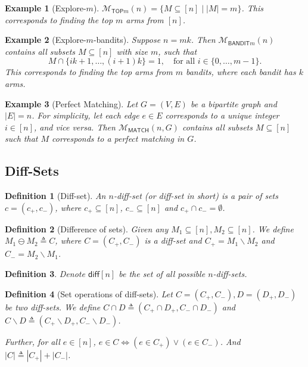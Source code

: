 \documentclass{article}
\newtheorem{define}{Definition}
\newtheorem{example}{Example}
\newcommand{\mmatch}{\mathcal M_{\mathsf{MATCH}}}
\newcommand{\mtop}{\mathcal M_{\mathsf{TOP}m}}
\newcommand{\mbandit}{\mathcal M_{\mathsf{BANDIT}m}}
\newcommand{\diff}{\mathsf{diff}}
\newcommand{\del}{\backslash}
\begin{document}
\begin{spacing}{1.1}
\begin{example}[Explore-$m$]
$\mtop(n)=\{M \subseteq [n] \;|\; |M|=m\}$.
This corresponds to finding the top $m$ arms from $[n]$.
\end{example}

\begin{example}[Explore-$m$-bandits]
Suppose $n=mk$. Then $\mbandit(n)$ contains all subsets $M \subseteq [n]$ with size $m$, such that 
$$ 
M\cap \{ik+1,\ldots, (i+1)k\} = 1, \quad \text{for all } i \in \{0,\ldots, m-1\}.
$$ 
This corresponds to finding the top arms from $m$ bandits, where each bandit has $k$ arms.
\end{example}

\begin{example}[Perfect Matching]
Let $G=(V,E)$ be a bipartite graph and $|E|=n$. 
For simplicity, let each edge $e\in E$ corresponds to a unique integer $i\in [n]$, and vice versa. 
Then $\mmatch(n,G)$ contains all subsets $M \subseteq [n]$ such that $M$ corresponds to a perfect matching in $G$.
\end{example}


\subsection{Diff-Sets}

\begin{define}[Diff-set]
An $n$-diff-set (or diff-set in short) is a pair of sets $c=(c_+,c_-)$, where $c_+\subseteq[n]$, $c_-\subseteq [n]$ and $c_+\cap c_-=\emptyset$.
\end{define}


\begin{define}[Difference of sets]
Given any $M_1\subseteq[n],M_2\subseteq[n]$. We define $M_1\ominus M_2 \triangleq C$, where $C=(C_+,C_-)$ is a diff-set and
$C_+ = M_1 \del M_2$ and $C_- = M_2\del M_1$.
\end{define}

\begin{define}
Denote $\diff[n]$ be the set of all possible $n$-diff-sets.
\end{define}

\begin{define}[Set operations of diff-sets] 
Let $C=(C_+,C_-), D=(D_+,D_-)$ be two diff-sets. 
We define 
$C\cap D \triangleq (C_+\cap D_+, C_-\cap D_-)$
and $C\del D \triangleq (C_+\del D_+, C_-\del D_-)$.

Further, for all $e\in [n]$, $e \in C \Leftrightarrow (e\in C_+)\vee(e\in C_-)$.
And $|C|\triangleq |C_+|+|C_-|$.
\end{define}


\end{spacing}
\end{document}
